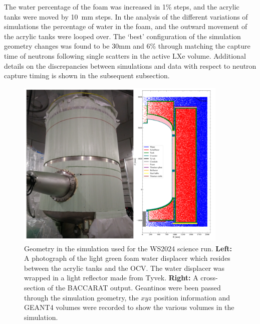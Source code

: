The water percentage of the foam was increased in 1\% steps, and the acrylic tanks were moved by 10~mm steps.
In the analysis of the different variations of simulations the percentage of water in the foam, and the outward movement of the acrylic tanks were looped over.
The `best' configuration of the simulation geometry changes was found to be 30mm and 6\% through matching the capture time of neutrons following single scatters in the active LXe volume. Additional details on the discrepancies between simulations and data with respect to neutron capture timing is shown in the subsequent subsection.
\begin{figure}[ht!]
	\centering
	\includegraphics[width=0.9\textwidth]{figures/VetoEfficiency/FoamImgAndSimGeoTogether.png}
	\caption{Geometry in the simulation used for the WS2024 science run. \textbf{Left:} A photograph of the light green foam water displacer which resides between the acrylic tanks and the OCV. The water displacer was wrapped in a light reflector made from Tyvek. \textbf{Right:} A cross-section of the BACCARAT output. Geantinos were been passed through the simulation geometry, the $xyz$ position information and GEANT4 volumes were recorded to show the various volumes in the simulation.}
	\label{fig:VetoEff/od_geometry_for_sr3}
\end{figure}

